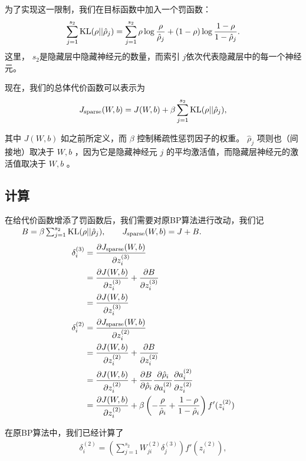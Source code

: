为了实现这一限制，我们在目标函数中加入一个罚函数：
\begin{align}
\sum_{j=1}^{s_2} {\rm KL}(\rho || \hat\rho_j)=\sum_{j=1}^{s_2} \rho \log \frac{\rho}{\hat\rho_j} + (1-\rho) \log \frac{1-\rho}{1-\hat\rho_j}.
\nonumber \end{align}
这里， $ s_2 $是隐藏层中隐藏神经元的数量，而索引 $ j $依次代表隐藏层中的每一个神经元。

 现在，我们的总体代价函数可以表示为
\begin{align}
J_{\rm sparse}(W,b) = J(W,b) + \beta \sum_{j=1}^{s_2} {\rm KL}(\rho || \hat\rho_j),
\nonumber \end{align}


其中 $ J(W,b) $ 如之前所定义，而 $ \beta $ 控制稀疏性惩罚因子的权重。 $ \hat\rho_j $ 项则也（间接地）取决于 $ W,b$  ，因为它是隐藏神经元 $ j $ 的平均激活值，而隐藏层神经元的激活值取决于 $ W,b $ 。

\subsection{计算}
在给代价函数增添了罚函数后，我们需要对原BP算法进行改动，我们记
$\qquad B=\beta \sum_{j=1}^{s_2} {\rm KL}(\rho || \hat\rho_j),\qquad J_{\rm sparse}(W,b)=J+B.$
\begin{align}
\delta^{(3)}_i &= \dfrac{\partial J_{\rm sparse}(W,b) }{\partial z_i^{(3)}}\nonumber\\
&=\dfrac{\partial J(W,b) }{\partial z_i^{(3)}}+\dfrac{\partial B }{\partial z_i^{(3)}}\nonumber\\
&=\dfrac{\partial J(W,b) }{\partial z_i^{(3)}}\nonumber \\
\delta^{(2)}_i &= \dfrac{\partial J_{\rm sparse}(W,b) }{\partial z_i^{(2)}}\nonumber\\
&=\dfrac{\partial J(W,b) }{\partial z_i^{(2)}}+\dfrac{\partial B }{\partial z_i^{(2)}}\nonumber\\
&=\dfrac{\partial J(W,b) }{\partial z_i^{(2)}}+
\dfrac{\partial B }{\partial \hat\rho_i}
\dfrac{\partial \hat\rho_i }{\partial a_i^{(2)}}
\dfrac{\partial a_i^{(2)} }{\partial z_i^{(2)}}\nonumber\\
&=
 \dfrac{\partial J(W,b) }{\partial z_i^{(2)}}
+ \beta \left( - \frac{\rho}{\hat\rho_i} + \frac{1-\rho}{1-\hat\rho_i} \right) f'(z^{(2)}_i) 
\nonumber\end{align}

在原BP算法中，我们已经计算了
\begin{align}
\delta^{(2)}_i = \left( \sum_{j=1}^{s_{2}} W^{(2)}_{ji} \delta^{(3)}_j \right) f'(z^{(2)}_i),
\nonumber \end{align}

